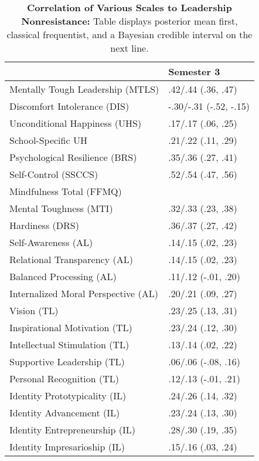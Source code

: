 \begin{table}[ht]
\centering
\begin{tabular}{ll}
  \hline
 & Semester 3 \\ 
  \hline
Mentally Tough Leadership (MTLS) & .42/.44 (.36, .47) \\ 
  Discomfort Intolerance (DIS) & -.30/-.31 (-.52, -.15) \\ 
  Unconditional Happiness (UHS) & .17/.17 (.06, .25) \\ 
  School-Specific UH & .21/.22 (.11, .29) \\ 
  Psychological Resilience (BRS) & .35/.36 (.27, .41) \\ 
  Self-Control (SSCCS) & .52/.54 (.47, .56) \\ 
  Mindfulness Total (FFMQ) &  \\ 
  Mental Toughness (MTI) & .32/.33 (.23, .38) \\ 
  Hardiness (DRS) & .36/.37 (.27, .42) \\ 
  Self-Awareness (AL) & .14/.15 (.02, .23) \\ 
  Relational Transparency (AL) & .14/.15 (.02, .23) \\ 
  Balanced Processing (AL) & .11/.12 (-.01, .20) \\ 
  Internalized Moral Perspective (AL) & .20/.21 (.09, .27) \\ 
  Vision (TL) & .23/.25 (.13, .31) \\ 
  Inspirational Motivation (TL) & .23/.24 (.12, .30) \\ 
  Intellectual Stimulation (TL) & .13/.14 (.02, .22) \\ 
  Supportive Leadership (TL) & .06/.06 (-.08, .16) \\ 
  Personal Recognition (TL) & .12/.13 (-.01, .21) \\ 
  Identity Prototypicality (IL) & .24/.26 (.14, .32) \\ 
  Identity Advancement (IL) & .23/.24 (.13, .30) \\ 
  Identity Entrepreneurship (IL) & .28/.30 (.19, .35) \\ 
  Identity Impresarioship (IL) & .15/.16 (.03, .24) \\ 
   \hline
\end{tabular}
\caption{\textbf{Correlation of Various Scales to Leadership Nonresistance:} Table displays posterior mean first, classical frequentist, and a Bayesian credible interval on the next line.} 
\label{tab:lnr_corr}
\end{table}
